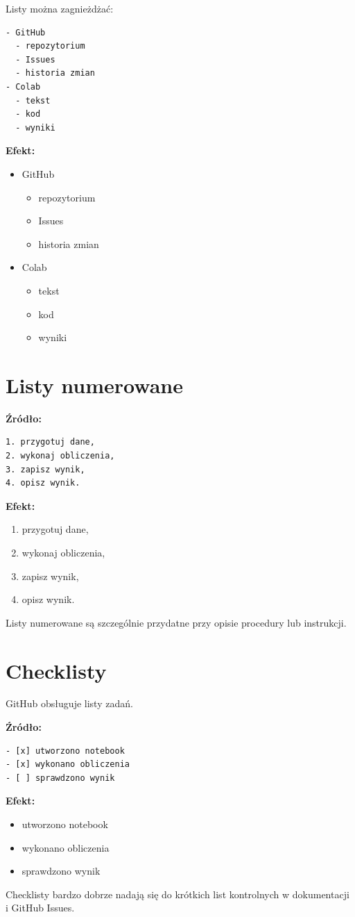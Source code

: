 \documentclass[12pt, a4paper]{article}
\begin{document}
Listy można zagnieżdżać:
\begin{lstlisting}
- GitHub
  - repozytorium
  - Issues
  - historia zmian
- Colab
  - tekst
  - kod
  - wyniki
\end{lstlisting}
\textbf{Efekt:}
\begin{itemize}
    \item GitHub
    \begin{itemize}
        \item repozytorium
        \item Issues
        \item historia zmian
    \end{itemize}
    \item Colab
    \begin{itemize}
        \item tekst
        \item kod
        \item wyniki
    \end{itemize}
\end{itemize}
\newpage
\section{Listy numerowane}
\textbf{Źródło:}
\begin{lstlisting}
1. przygotuj dane,
2. wykonaj obliczenia,
3. zapisz wynik,
4. opisz wynik.
\end{lstlisting}

\textbf{Efekt:}
\begin{enumerate}
    \item przygotuj dane,
    \item wykonaj obliczenia,
    \item zapisz wynik,
    \item opisz wynik.
\end{enumerate}
Listy numerowane są szczególnie przydatne przy opisie procedury lub instrukcji.

\section{Checklisty}
GitHub obsługuje listy zadań.

\textbf{Źródło:}
\begin{lstlisting}
- [x] utworzono notebook
- [x] wykonano obliczenia
- [ ] sprawdzono wynik
\end{lstlisting}

\textbf{Efekt:}
\begin{itemize}
    \item[$\boxtimes$] utworzono notebook
    \item[$\boxtimes$] wykonano obliczenia
    \item[$\square$] sprawdzono wynik
\end{itemize}
Checklisty bardzo dobrze nadają się do krótkich list kontrolnych w dokumentacji i GitHub Issues.
\newpage
\end{document}
